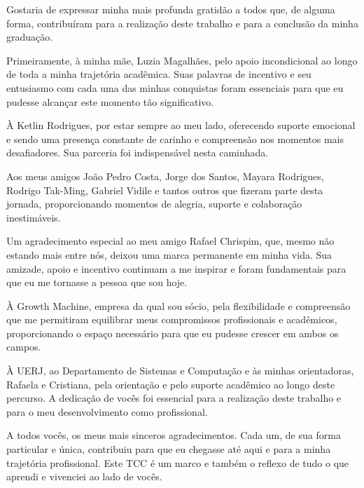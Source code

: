 
Gostaria de expressar minha mais profunda gratidão a todos que, de alguma forma, contribuíram para a realização deste trabalho e para a conclusão da minha graduação.

Primeiramente, à minha mãe, Luzia Magalhães, pelo apoio incondicional ao longo de toda a minha trajetória acadêmica. Suas palavras de incentivo e seu entusiasmo com cada uma das minhas conquistas foram essenciais para que eu pudesse alcançar este momento tão significativo.

À Ketlin Rodrigues, por estar sempre ao meu lado, oferecendo suporte emocional e sendo uma presença constante de carinho e compreensão nos momentos mais desafiadores. Sua parceria foi indispensável nesta caminhada.

Aos meus amigos João Pedro Costa, Jorge dos Santos, Mayara Rodrigues, Rodrigo Tak-Ming, Gabriel Vidile e tantos outros que fizeram parte desta jornada, proporcionando momentos de alegria, suporte e colaboração inestimáveis.

Um agradecimento especial ao meu amigo Rafael Chrispim, que, mesmo não estando mais entre nós, deixou uma marca permanente em minha vida. Sua amizade, apoio e incentivo continuam a me inspirar e foram fundamentais para que eu me tornasse a pessoa que sou hoje.

À Growth Machine, empresa da qual sou sócio, pela flexibilidade e compreensão que me permitiram equilibrar meus compromissos profissionais e acadêmicos, proporcionando o espaço necessário para que eu pudesse crescer em ambos os campos.

À UERJ, ao Departamento de Sistemas e Computação e às minhas orientadoras, Rafaela e Cristiana, pela orientação e pelo suporte acadêmico ao longo deste percurso. A dedicação de vocês foi essencial para a realização deste trabalho e para o meu desenvolvimento como profissional.

A todos vocês, os meus mais sinceros agradecimentos. Cada um, de sua forma particular e única, contribuiu para que eu chegasse até aqui e para a minha trajetória profissional. Este TCC é um marco e também o reflexo de tudo o que aprendi e vivenciei ao lado de vocês.
